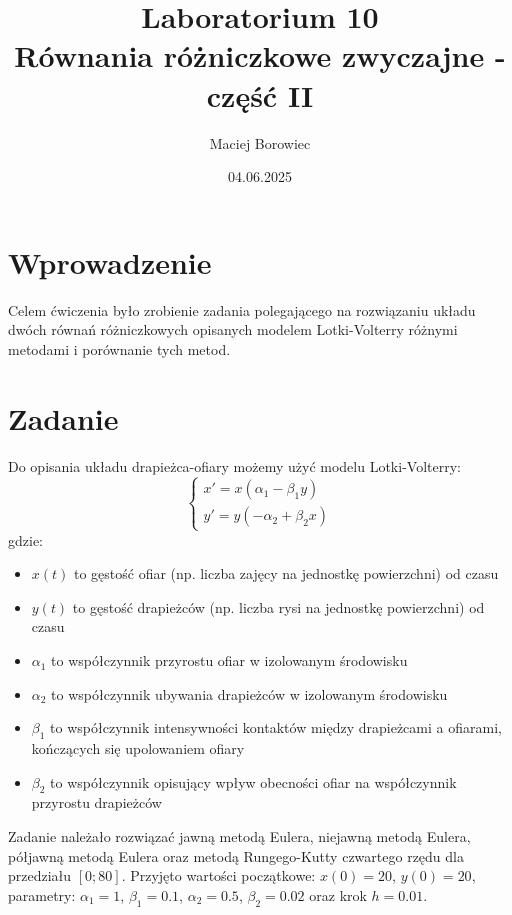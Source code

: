 \documentclass{article}
\title{Laboratorium 10 \\ Równania różniczkowe zwyczajne - część II}
\author{Maciej Borowiec}
\date{04.06.2025}
\begin{document}
\maketitle

\section{Wprowadzenie}
Celem ćwiczenia było zrobienie zadania polegającego na rozwiązaniu układu dwóch równań różniczkowych opisanych modelem Lotki-Volterry różnymi metodami i porównanie tych metod.

\section{Zadanie}
Do opisania układu drapieżca-ofiary możemy użyć modelu Lotki-Volterry:
\begin{equation}
    \begin{cases}
        x' = x(\alpha_1 - \beta_1y) \\
        y' = y(-\alpha_2 + \beta_2x)
    \end{cases} \nonumber
\end{equation}
gdzie:
\begin{itemize}
\item $x(t)$ to gęstość ofiar (np. liczba zajęcy na jednostkę powierzchni) od czasu
\item $y(t)$ to gęstość drapieżców (np. liczba rysi na jednostkę powierzchni) od czasu
\item $\alpha_1$ to współczynnik przyrostu ofiar w izolowanym środowisku
\item $\alpha_2$ to współczynnik ubywania drapieżców w izolowanym środowisku
\item $\beta_1$ to współczynnik intensywności kontaktów między drapieżcami a ofiarami, kończących się upolowaniem ofiary
\item $\beta_2$ to współczynnik opisujący wpływ obecności ofiar na współczynnik przyrostu drapieżców
\end{itemize}
Zadanie należało rozwiązać jawną metodą Eulera, niejawną metodą Eulera, półjawną metodą Eulera oraz metodą Rungego-Kutty czwartego rzędu dla przedziału $[0;80]$. Przyjęto wartości początkowe: $x(0) = 20$, $y(0) = 20$, parametry: $\alpha_1 = 1$, $\beta_1 = 0.1$, $\alpha_2 = 0.5$, $\beta_2 = 0.02$ oraz krok $h = 0.01$.
\end{document}
